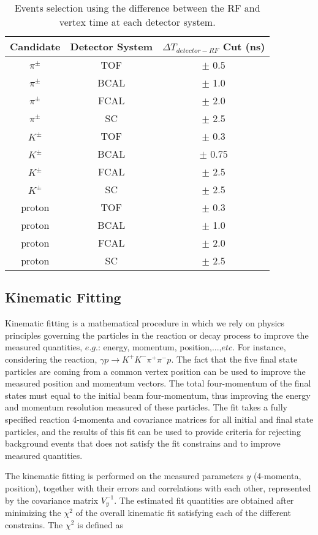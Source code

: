 \begin{table}[H]
    \centering
    \small
    \caption{Events selection using the difference between the RF and vertex time at each detector system.}
    \label{tab.y2175.evt_sel.pid_tim_sel}
    \begin{tabular}{|c|c|c|}
        \hline
        Candidate & Detector System & $\Delta T_{detector-RF}$ Cut (ns) \\
        \hline
        $\pi^{\pm}$ & TOF & $\pm$ 0.5 \\
        \hline
        $\pi^{\pm}$ & BCAL & $\pm$ 1.0 \\
        \hline
        $\pi^{\pm}$ & FCAL & $\pm$ 2.0 \\
        \hline
        $\pi^{\pm}$ & SC & $\pm$ 2.5 \\
        \hline
        $K^{\pm}$ & TOF &  $\pm$ 0.3 \\
        \hline
        $K^{\pm}$ & BCAL & $\pm$ 0.75 \\
        \hline
        $K^{\pm}$ & FCAL & $\pm$ 2.5 \\
        \hline
        $K^{\pm}$ & SC & $\pm$ 2.5 \\
        \hline
        proton & TOF & $\pm$ 0.3 \\
        \hline
        proton & BCAL & $\pm$ 1.0 \\
        \hline
        proton & FCAL & $\pm$ 2.0 \\
        \hline
        proton & SC & $\pm$ 2.5 \\
        \hline
    \end{tabular}
\end{table}

\subsection{Kinematic Fitting}
\label{chap.y2175.evt_sel.kin_fit}

Kinematic fitting is a mathematical procedure in which we rely on physics principles governing the particles in the reaction or decay process to improve the measured quantities, $e.g.$: energy, momentum, position,...,$etc$. For instance, considering the reaction, $\gamma p \rightarrow K^+ K^- \pi^+ \pi^- p$. The fact that the five final state particles are coming from a common vertex position can be used to improve the measured position and momentum vectors. The total four-momentum of the final states must equal to the initial beam four-momentum, thus improving the energy and momentum resolution measured of these particles. The fit takes a fully specified reaction 4-momenta and covariance matrices for all initial and final state particles, and the results of this fit can be used to  provide criteria for rejecting background events that does not satisfy the fit constrains and to improve measured quantities.
~\par The kinematic fitting is performed on the measured parameters $y$ (4-momenta, position), together with their errors and correlations with each other, represented by the covariance matrix $V_{y}^{-1}$. The estimated fit quantities are obtained after minimizing the $\chi^{2}$ of the overall kinematic fit satisfying each of the different constrains. The $\chi^{2}$ is defined as

